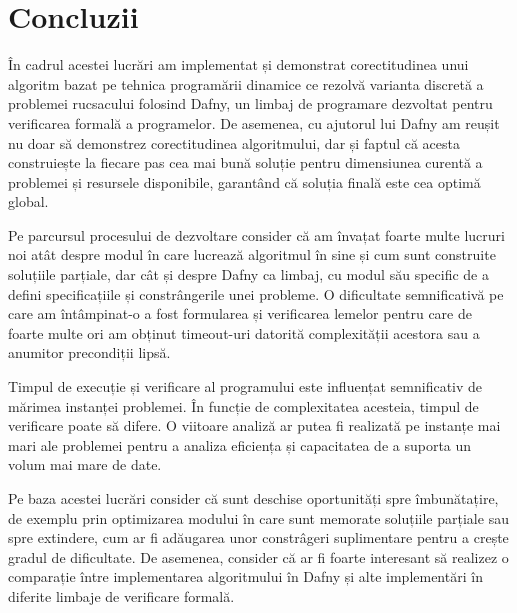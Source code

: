 \chapter*{Concluzii} 

\begin{sloppypar}

În cadrul acestei lucrări am implementat și demonstrat corectitudinea unui algoritm  bazat pe tehnica programării dinamice ce rezolvă varianta discretă a problemei rucsacului folosind Dafny, un limbaj de programare dezvoltat pentru verificarea formală a programelor. De asemenea, cu ajutorul lui Dafny am reușit nu doar să demonstrez corectitudinea algoritmului, dar și faptul că acesta construiește la fiecare pas cea mai bună soluție pentru dimensiunea curentă a problemei și resursele disponibile, garantând că soluția finală este cea optimă global. \par
Pe parcursul procesului de dezvoltare consider că am învațat foarte multe lucruri noi atât despre modul în care lucrează algoritmul în sine și cum sunt construite soluțiile parțiale, dar cât și despre Dafny ca limbaj, cu modul său specific de a defini specificațiile și constrângerile unei probleme. O dificultate semnificativă pe care am întâmpinat-o a fost formularea și verificarea lemelor pentru care de foarte multe ori am obținut timeout-uri datorită complexității acestora sau a anumitor precondiții lipsă. \par
Timpul de execuție și verificare al programului este influențat semnificativ de mărimea instanței problemei. În funcție de complexitatea acesteia, timpul de verificare poate să difere. O viitoare analiză ar putea fi realizată pe instanțe mai mari ale problemei pentru a analiza eficiența și capacitatea de a suporta un volum mai mare de date. \par
Pe baza acestei lucrări consider că sunt deschise oportunități spre  îmbunătațire, de exemplu prin optimizarea modului în care sunt memorate soluțiile parțiale sau spre extindere, cum ar fi adăugarea unor constrâgeri suplimentare pentru a crește gradul de dificultate. De asemenea, consider că ar fi foarte interesant să realizez o comparație între implementarea algoritmului în Dafny și alte implementări în diferite limbaje de verificare formală.

\end{sloppypar}